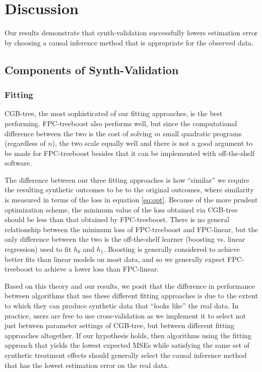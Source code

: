 \section{Discussion}
\label{sec:disc}

Our results demonstrate that synth-validation successfully lowers estimation error by choosing a causal inference method that is appropriate for the observed data.

\subsection{Components of Synth-Validation}

\subsubsection{Fitting}
CGB-tree, the most sophisticated of our fitting approaches, is the best performing. FPC-treeboost also performs well, but since the computational difference between the two is the cost of solving $m$ small quadratic programs (regardless of $n$), the two scale equally well and there is not a good argument to be made for FPC-treeboost besides that it can be implemented with off-the-shelf software.

The difference between our three fitting approaches is how ``similar'' we require the resulting synthetic outcomes to be to the original outcomes, where similarity is measured in terms of the loss in equation \ref{eq:opt}. Because of the more prudent optimization scheme, the minimum value of the loss obtained via CGB-tree should be less than that obtained by FPC-treeboost. There is no general relationship between the minimum loss of FPC-treeboost and FPC-linear, but the only difference between the two is the off-the-shelf learner (boosting vs. linear regression) used to fit $h_0$ and $h_1$. Boosting is generally considered to achieve better fits than linear models on most data, and so we generally expect FPC-treeboost to achieve a lower loss than FPC-linear. 

Based on this theory and our results, we posit that the difference in performance between algorithms that use these different fitting approaches is due to the extent to which they can produce synthetic data that ``looks like'' the real data. In practice, users are free to use cross-validation as we implement it to select not just between parameter settings of CGB-tree, but between different fitting approaches altogether. If our hypothesis holds, then algorithms using the fitting approach that yields the lowest expected MSEs while satisfying the same set of synthetic treatment effects should generally select the causal inference method that has the lowest estimation error on the real data.

